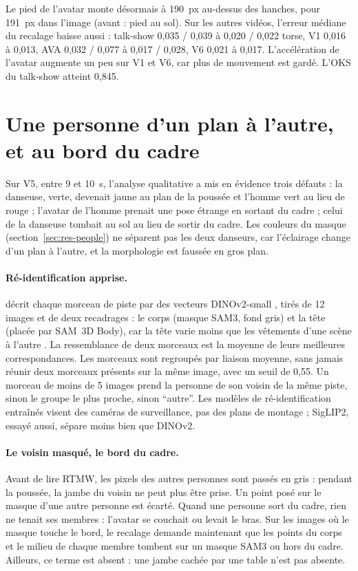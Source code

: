 \documentclass[11pt,a4paper]{report}
\newcommand{\code}[1]{\texttt{\detokenize{#1}}}
\begin{document}
Le pied de l'avatar monte désormais à 190~px au-dessus des hanches, pour 191~px dans l'image (avant : pied au sol). Sur les autres
vidéos, l'erreur médiane du recalage baisse aussi : talk-show 0,035 / 0,039 à 0,020 / 0,022 torse, V1 0,016 à 0,013, AVA 0,032 / 0,077
à 0,017 / 0,028, V6 0,021 à 0,017. L'accélération de l'avatar augmente un peu sur V1 et V6, car plus de mouvement est gardé. L'OKS du
talk-show atteint 0,845.

\section{Une personne d'un plan à l'autre, et au bord du cadre}
\label{sec:res-reid}

Sur V5, entre 9 et 10~s, l'analyse qualitative a mis en évidence trois défauts : la danseuse, verte, devenait jaune au plan de la poussée et l'homme vert au
lieu de rouge ; l'avatar de l'homme prenait une pose étrange en sortant du cadre ; celui de la danseuse tombait au sol au lieu de sortir
du cadre. Les couleurs du masque (section~\ref{sec:res-people}) ne séparent pas les deux danseurs, car l'éclairage change d'un plan à
l'autre, et la morphologie est faussée en gros plan.

\paragraph{Ré-identification apprise.} \code{reid_people.py} décrit chaque morceau de piste par des vecteurs DINOv2-small
\cite{oquab2023dinov2}, tirés de 12 images et de deux recadrages : le corps (masque SAM3, fond gris) et la tête (placée par SAM~3D Body),
car la tête varie moins que les vêtements d'une scène à l'autre \cite{tran2024headstream}. La ressemblance de deux morceaux est la
moyenne de leurs meilleures correspondances. Les morceaux sont regroupés par liaison moyenne, sans jamais réunir deux morceaux
présents sur la même image, avec un seuil de 0,55. Un morceau de moins de 5 images prend la personne de son voisin de la même piste,
sinon le groupe le plus proche, sinon \enquote{autre}. Les modèles de ré-identification entraînés visent des caméras de surveillance,
pas des plans de montage \cite{balasubramanian2026reid} ; SigLIP2, essayé aussi, sépare moins bien que DINOv2.

\paragraph{Le voisin masqué, le bord du cadre.} Avant de lire RTMW, les pixels des autres personnes sont passés en gris : pendant la
poussée, la jambe du voisin ne peut plus être prise. Un point posé sur le masque d'une autre personne est écarté. Quand une personne
sort du cadre, rien ne tenait ses membres : l'avatar se couchait ou levait le bras. Sur les images où le masque touche le bord, le
recalage demande maintenant que les points du corps et le milieu de chaque membre tombent sur un masque SAM3 ou hors du cadre. Ailleurs,
ce terme est absent : une jambe cachée par une table n'est pas absente.
\end{document}
